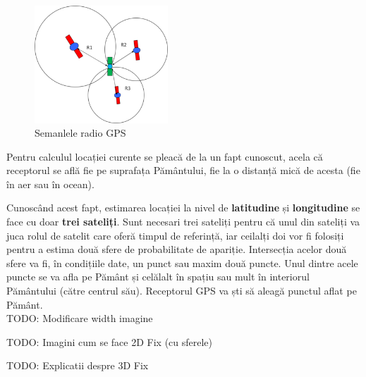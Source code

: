 \documentclass[12pt,a4paper]{article}
\begin{document}
\begin{figure}[h]
\centering
\includegraphics[width=5cm]{figures/gps_signals.png}
\caption{Semanlele radio GPS}
\label{fig:gps_signals}
\end{figure}

Pentru calculul locației curente se pleacă de la un fapt cunoscut, acela că receptorul se află fie pe suprafața Pământului, fie la o distanță mică de acesta (fie în aer sau în ocean).

Cunoscând acest fapt, estimarea locației la nivel de \textbf{latitudine} și \textbf{longitudine} se face cu doar \textbf{trei sateliți}. Sunt necesari trei sateliți pentru că unul din sateliți va juca rolul de satelit care oferă timpul de referință, iar ceilalți doi vor fi folosiți pentru a estima două sfere de probabilitate de apariție. Intersecția acelor două sfere va fi, în condițiile date, un punct sau maxim două puncte. Unul dintre acele puncte se va afla pe Pământ și celălalt în spațiu sau mult în interiorul Pământului (către centrul său). Receptorul GPS va ști să aleagă punctul aflat pe Pământ.\\

TODO: Modificare width imagine

TODO: Imagini cum se face 2D Fix (cu sferele)

TODO: Explicatii despre 3D Fix


\newpage


\nocite{*}
\end{document}
